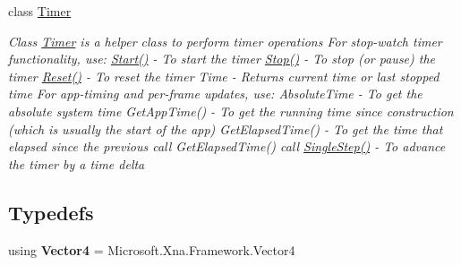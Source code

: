 \begin{DoxyCompactItemize}
class \hyperlink{class_microsoft_1_1_samples_1_1_kinect_1_1_avateering_1_1_filters_1_1_timer}{Timer}
\begin{DoxyCompactList}\small\item\em Class \hyperlink{class_microsoft_1_1_samples_1_1_kinect_1_1_avateering_1_1_filters_1_1_timer}{Timer} is a helper class to perform timer operations For stop-\/watch timer functionality, use\+: \hyperlink{class_microsoft_1_1_samples_1_1_kinect_1_1_avateering_1_1_filters_1_1_timer_a463741040cda49273475a5722322b73d}{Start()} -\/ To start the timer \hyperlink{class_microsoft_1_1_samples_1_1_kinect_1_1_avateering_1_1_filters_1_1_timer_a018da7ed7832a2257569dd87e68e6137}{Stop()} -\/ To stop (or pause) the timer \hyperlink{class_microsoft_1_1_samples_1_1_kinect_1_1_avateering_1_1_filters_1_1_timer_a938e1304e5e4aaa916a5ef010ff8fc28}{Reset()} -\/ To reset the timer Time -\/ Returns current time or last stopped time For app-\/timing and per-\/frame updates, use\+: Absolute\+Time -\/ To get the absolute system time Get\+App\+Time() -\/ To get the running time since construction (which is usually the start of the app) Get\+Elapsed\+Time() -\/ To get the time that elapsed since the previous call Get\+Elapsed\+Time() call \hyperlink{class_microsoft_1_1_samples_1_1_kinect_1_1_avateering_1_1_filters_1_1_timer_a02e586f1d448e09be37c47a28791d0fc}{Single\+Step()} -\/ To advance the timer by a time delta \end{DoxyCompactList}\end{DoxyCompactItemize}
\subsection*{Typedefs}
\begin{DoxyCompactItemize}
\item 
\hypertarget{namespace_microsoft_1_1_samples_1_1_kinect_1_1_avateering_1_1_filters_ad936d0c82f94228f325de9ade835245e}{using {\bfseries Vector4} = Microsoft.\+Xna.\+Framework.\+Vector4}\label{namespace_microsoft_1_1_samples_1_1_kinect_1_1_avateering_1_1_filters_ad936d0c82f94228f325de9ade835245e}

\end{DoxyCompactItemize}
